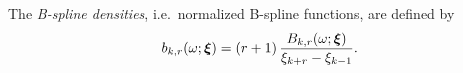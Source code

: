 \documentclass[twocolumn,final]{svjour3}
\newcommand{\bm}[1]{\mbox{\boldmath $#1$}}
\begin{document}
The \textit{B-spline densities}, i.e.\ normalized B-spline functions, are defined by
\begin{align*}
b_{k,r}(\omega; \bm{\xi}) = \left(r+1\right) \dfrac{B_{k,r}(\omega;\bm{\xi})}{\xi_{k+r} - \xi_{k-1}}.
\end{align*}

\end{document}
